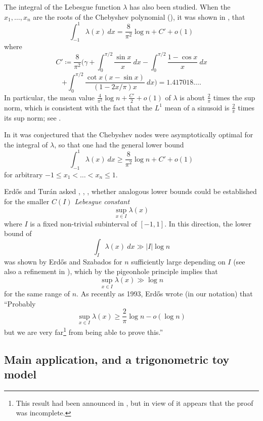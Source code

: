 \documentclass[12pt]{amsart}
\begin{document}
The integral of the Lebesgue function $\lambda$ has also been studied. When the $x_1,\dots, x_n$ are the roots of the Chebyshev polynomial (), it was shown in
\cite[Theorem 3.1]{bgt}, that
$$ \int_{-1}^1 \lambda(x)\ dx = \frac{8}{\pi^2} \log n + C' + o(1)$$
where
$$ C' \coloneqq \frac{8}{\pi^2} \Biggl( \gamma + \int_0^{\pi/2} \frac{\sin x}{x}\ dx - \int_0^{\pi/2} \frac{1-\cos x}{x}\ dx $$
$$ + \int_0^{\pi/2} \frac{\cot x (x-\sin x)}{(1-2x/\pi) x}\ dx\Biggr) = 1.417018\dots.$$
In particular, the mean value $\frac{4}{\pi^2} \log n + \frac{C'}{2} + o(1)$ of $\lambda$ is about $\frac{2}{\pi}$ times the sup norm, which is consistent with the fact that the $L^1$ mean of a sinusoid is $\frac{2}{\pi}$ times its sup norm; see .

In \cite{erd-cluj} it was conjectured that the Chebyshev nodes were asymptotically optimal for the integral of $\lambda$, so that one had the general lower bound
\begin{equation}\label{integral-conj}
    \int_{-1}^1 \lambda(x)\ dx \geq \frac{8}{\pi^2} \log n + C' + o(1)
\end{equation}
for arbitrary $-1 \leq x_1 < \dots < x_n \leq 1$.


Erd\H{o}s and Tur\'an asked \cite[p. 224]{et}, \cite{erdos-open}, \cite{various}, \cite[Problem 1153]{bloom} whether analogous lower bounds could be established for the smaller \emph{$C(I)$ Lebesgue constant}
\begin{equation}\label{maxl-loc}
 \sup_{x \in I} \lambda(x)
\end{equation}
where $I$ is a fixed non-trivial subinterval of $[-1,1]$.  In this direction, the lower bound of
$$  \int_I \lambda(x)\ dx \gg |I| \log n$$
was shown by Erd\H{o}s and Szabados \cite{esz} for $n$ sufficiently large depending on $I$ (see also a refinement in \cite{eszv}), which by the pigeonhole principle implies that
$$  \sup_{x \in I} \lambda(x) \gg \log n$$
for the same range of $n$. As recently as 1993, Erd\H{o}s  \cite{erdos-open} wrote (in our notation) that ``Probably
\begin{equation}\label{lln}
    \sup_{x \in I} \lambda(x) \geq \frac{2}{\pi} \log n - o(\log n)
\end{equation}
but we are very far\footnote{This result had been announced in \cite[(6)]{erd-cluj}, but in view of \cite{erdos-open} it appears that the proof was incomplete.} from being able to prove this.''

\subsection{Main application, and a trigonometric toy model}
\end{document}
